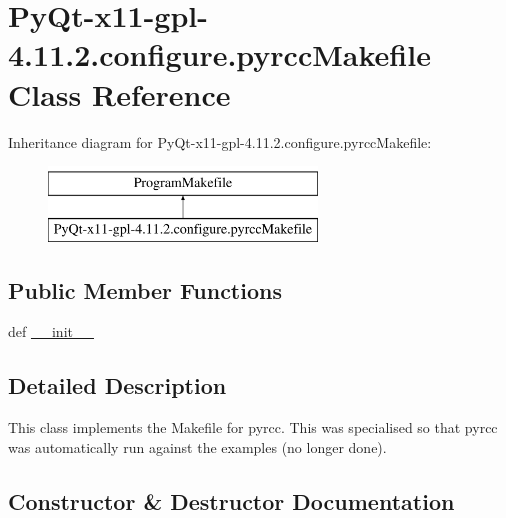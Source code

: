 \hypertarget{classPyQt-x11-gpl-4_811_82_1_1configure_1_1pyrccMakefile}{}\section{Py\+Qt-\/x11-\/gpl-\/4.11.2.configure.\+pyrcc\+Makefile Class Reference}
\label{classPyQt-x11-gpl-4_811_82_1_1configure_1_1pyrccMakefile}
Inheritance diagram for Py\+Qt-\/x11-\/gpl-\/4.11.2.configure.\+pyrcc\+Makefile\+:\begin{figure}[H]
\begin{center}
\leavevmode
\includegraphics[height=2.000000cm]{classPyQt-x11-gpl-4_811_82_1_1configure_1_1pyrccMakefile}
\end{center}
\end{figure}
\subsection*{Public Member Functions}
\begin{DoxyCompactItemize}
\item 
def \hyperlink{classPyQt-x11-gpl-4_811_82_1_1configure_1_1pyrccMakefile_a350f703b2b89ccb61c4c97763821423e}{\+\_\+\+\_\+init\+\_\+\+\_\+}
\end{DoxyCompactItemize}


\subsection{Detailed Description}
\begin{DoxyVerb}This class implements the Makefile for pyrcc.  This was specialised so
that pyrcc was automatically run against the examples (no longer done).
\end{DoxyVerb}
 

\subsection{Constructor \& Destructor Documentation}
\hypertarget{classPyQt-x11-gpl-4_811_82_1_1configure_1_1pyrccMakefile_a350f703b2b89ccb61c4c97763821423e}{}
